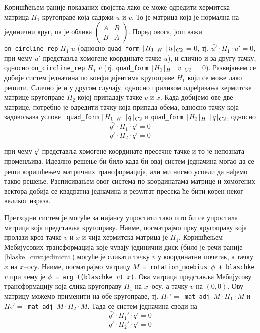 Коришћењем раније показаних својства лако се може одредити хермитска
матрица $H_1$ кругоправе која садржи $u$ и $v$. То је матрица која је
нормална на јединични круг, па је облика $\left(\begin{array}{cc}A &
  B\\\bar{B} & A\end{array}\right)$. Поред овога, још важи {\tt
    on\_circline\_rep} $H_1$ $u$ (односно {\tt quad\_form}
  $\lfloor H_1\rfloor_{H}$ $\lfloor u\rfloor_{C2}$ = $0$, тј. $\bar{u'}\cdot H_1\cdot u' =
  0$, при чему $u'$ представља хомогене координате тачке $u$), и
  слично и за другу тачку, односно {\tt on\_circline\_rep} $H_1$ $v$
  (тј. {\tt quad\_form} $\lfloor H_1\rfloor_{H}$ $\lfloor v\rfloor_{C2}$ = $0$). Развијањем
  се добије систем једначина по коефицијентима кругоправе $H_1$ који
  се може лако решити. Слично је и у другом случају, односно приликом
  одређивања хермитске матрице кругоправе $H_2$ којој припадају тачке
  $v$ и $x$. Када добијемо ове две матрице, потребно је одредити тачку
  која припада обема, односно тачку која задовољава услове {\tt
    quad\_form} $\lfloor H_1\rfloor_{H}$ $\lfloor q\rfloor_{C2}$ и {\tt quad\_form}
  $\lfloor H_2\rfloor_{H}$ $\lfloor q\rfloor_{C2}$, односно
$$\bar{q'}\cdot H_1\cdot q' = 0$$
$$\bar{q'}\cdot H_2\cdot q' = 0$$

\noindent при чему $q'$ представља хомогене координате пресечне тачке
и то је непозната променљива. Идеално решење би било када би овај
систем једначина могао да се реши коришћењем матричних трансформација,
али ми нисмо успели да нађемо такво решење. Расписивањем овог система
по координатама матрице и хомогених вектора добија се квадратна
једначина и резултат пресека ће бити корен неког великог израза.

Претходни систем је могуће за нијансу упростити тако што би се
упростила матрица која представља кругоправу. Наиме, посматрајмо прву
кругоправу која пролази кроз тачке $v$ и $x$ и чија хермитска матрица
је $H_1$. Коришћењем Мебијусових трансформација које чувају јединични
диск (било је речи раније \ref{blaske_cuvajedinicni}) могуће је
сликати тачку $v$ у координатни почетак, а тачку $x$ на
$x$--осу. Наиме, посматрајмо матрицу {\tt $M$ = rotation\_moebius
  $\phi$ + blaschke $v$} при чему је {\tt $\phi$ = arg ((blaschke $v$)
  $x$)}. Ова матрица представља Мебијусову трансформацију која слика
кругоправу $H_1$ на $x$--осу, а тачку $v$ на $(0, 0)$. Ову матрицу
можемо применити на обе кругоправе, тј. {\tt $H_1' =$ mat\_adj $M
  \cdot H_1 \cdot M$} и {\tt $H_2' =$ mat\_adj $M \cdot H_2 \cdot
  M$}. Тада се систем једначина своди на
$$\bar{q'}\cdot H_1'\cdot q' = 0$$
$$\bar{q'}\cdot H_2'\cdot q' = 0$$

